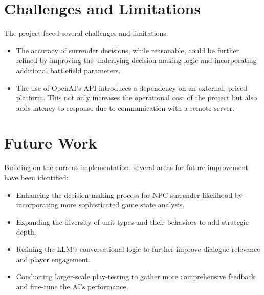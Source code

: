 \section{Challenges and Limitations}
The project faced several challenges and limitations:
\begin{itemize}
    \item The accuracy of surrender decisions, while reasonable, could be further refined by improving the underlying decision-making logic and incorporating additional battlefield parameters.
    \item The use of OpenAI's API introduces a dependency on an external, priced platform. This not only increases the operational cost of the project but also adds latency to response due to communication with a remote server.
\end{itemize}

\section{Future Work}
Building on the current implementation, several areas for future improvement have been identified:
\begin{itemize}
    \item Enhancing the decision-making process for NPC surrender likelihood by incorporating more sophisticated game state analysis.
    \item Expanding the diversity of unit types and their behaviors to add strategic depth.
    \item Refining the LLM's conversational logic to further improve dialogue relevance and player engagement.
    \item Conducting larger-scale play-testing to gather more comprehensive feedback and fine-tune the AI's performance.
\end{itemize}